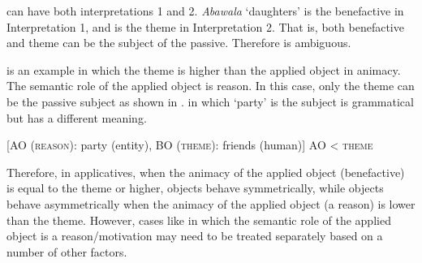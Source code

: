 \documentclass[output=paper,
            colorlinks, citecolor=brown
            ,draftmode
		  ]{langscibook}
\begin{document}
    

    

     can have both interpretations 1 and 2. \textit{Abawala} ‘daughters’ is the benefactive in Interpretation 1, and is the theme in Interpretation 2. That is, both benefactive and theme can be the subject of the passive. Therefore  is ambiguous.


      is an example in which the theme is higher than the applied object in animacy. The semantic role of the applied object is reason. In this case, only the theme can be the passive subject as shown in .  in which ‘party’ is the subject is grammatical but has a different meaning. 

\newpage
\ea%
    \label{ex:yoneda:23}
    [AO (\textsc{reason}): party (entity), BO (\textsc{theme}): friends (human)]  AO < \textsc{theme}
    \z
\z
        

        


    Therefore, in applicatives, when the animacy of the applied object (benefactive) is equal to the theme or higher, objects behave symmetrically, while objects behave asymmetrically when the animacy of the applied object (a reason) is lower than the theme. However, cases like  in which the semantic role of the applied object is a reason/motivation may need to be treated separately based on a number of other factors. 
\end{document}
